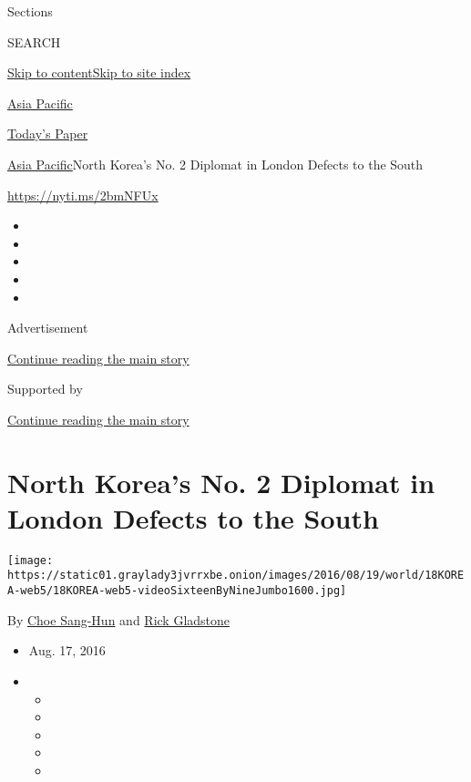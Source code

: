 Sections

SEARCH

\protect\hyperlink{site-content}{Skip to
content}\protect\hyperlink{site-index}{Skip to site index}

\href{https://www.nytimes3xbfgragh.onion/section/world/asia}{Asia
Pacific}

\href{https://myaccount.nytimes3xbfgragh.onion/auth/login?response_type=cookie\&client_id=vi}{}

\href{https://www.nytimes3xbfgragh.onion/section/todayspaper}{Today's
Paper}

\href{/section/world/asia}{Asia Pacific}\textbar{}North Korea's No. 2
Diplomat in London Defects to the South

\url{https://nyti.ms/2bmNFUx}

\begin{itemize}
\item
\item
\item
\item
\item
\end{itemize}

Advertisement

\protect\hyperlink{after-top}{Continue reading the main story}

Supported by

\protect\hyperlink{after-sponsor}{Continue reading the main story}

\hypertarget{north-koreas-no-2-diplomat-in-london-defects-to-the-south}{%
\section{North Korea's No. 2 Diplomat in London Defects to the
South}\label{north-koreas-no-2-diplomat-in-london-defects-to-the-south}}

\texttt{[image: https://static01.graylady3jvrrxbe.onion/images/2016/08/19/world/18KOREA-web5/18KOREA-web5-videoSixteenByNineJumbo1600.jpg]}

By \href{http://www.nytimes3xbfgragh.onion/by/choe-sang-hun}{Choe
Sang-Hun} and
\href{https://www.nytimes3xbfgragh.onion/by/rick-gladstone}{Rick
Gladstone}

\begin{itemize}
\item
  Aug. 17, 2016
\item
  \begin{itemize}
  \item
  \item
  \item
  \item
  \item
  \end{itemize}
\end{itemize}

